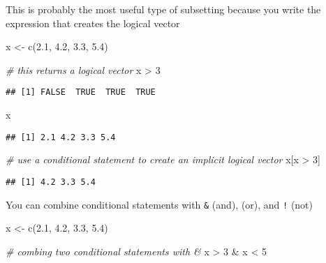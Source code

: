\documentclass[
]{book}
\newenvironment{Shaded}{\begin{snugshade}}{\end{snugshade}}
\newcommand{\CommentTok}[1]{\textcolor[rgb]{0.56,0.35,0.01}{\textit{#1}}}
\newcommand{\DecValTok}[1]{\textcolor[rgb]{0.00,0.00,0.81}{#1}}
\newcommand{\FloatTok}[1]{\textcolor[rgb]{0.00,0.00,0.81}{#1}}
\newcommand{\FunctionTok}[1]{\textcolor[rgb]{0.00,0.00,0.00}{#1}}
\newcommand{\NormalTok}[1]{#1}
\newcommand{\OtherTok}[1]{\textcolor[rgb]{0.56,0.35,0.01}{#1}}
\newcommand{\SpecialCharTok}[1]{\textcolor[rgb]{0.00,0.00,0.00}{#1}}
\begin{document}
This is probably the most useful type of subsetting because you write the expression that creates the logical vector

\begin{Shaded}
\begin{Highlighting}[]
\NormalTok{x }\OtherTok{\textless{}{-}} \FunctionTok{c}\NormalTok{(}\FloatTok{2.1}\NormalTok{, }\FloatTok{4.2}\NormalTok{, }\FloatTok{3.3}\NormalTok{, }\FloatTok{5.4}\NormalTok{)}

\CommentTok{\# this returns a logical vector}
\NormalTok{x }\SpecialCharTok{\textgreater{}} \DecValTok{3}
\end{Highlighting}
\end{Shaded}

\begin{verbatim}
## [1] FALSE  TRUE  TRUE  TRUE
\end{verbatim}

\begin{Shaded}
\begin{Highlighting}[]
\NormalTok{x}
\end{Highlighting}
\end{Shaded}

\begin{verbatim}
## [1] 2.1 4.2 3.3 5.4
\end{verbatim}

\begin{Shaded}
\begin{Highlighting}[]
\CommentTok{\# use a conditional statement to create an implicit logical vector}
\NormalTok{x[x }\SpecialCharTok{\textgreater{}} \DecValTok{3}\NormalTok{]}
\end{Highlighting}
\end{Shaded}

\begin{verbatim}
## [1] 4.2 3.3 5.4
\end{verbatim}

You can combine conditional statements with \texttt{\&} (and), \texttt{\textbar{}} (or), and \texttt{!} (not)

\begin{Shaded}
\begin{Highlighting}[]
\NormalTok{x }\OtherTok{\textless{}{-}} \FunctionTok{c}\NormalTok{(}\FloatTok{2.1}\NormalTok{, }\FloatTok{4.2}\NormalTok{, }\FloatTok{3.3}\NormalTok{, }\FloatTok{5.4}\NormalTok{)}

\CommentTok{\# combing two conditional statements with \&}
\NormalTok{x }\SpecialCharTok{\textgreater{}} \DecValTok{3} \SpecialCharTok{\&}\NormalTok{ x }\SpecialCharTok{\textless{}} \DecValTok{5}
\end{Highlighting}
\end{Shaded}
\end{document}
